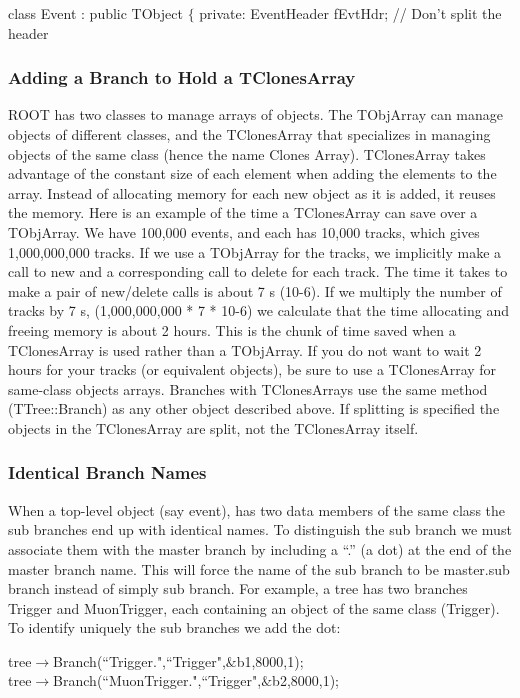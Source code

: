 \documentclass[12pt,a4paper]{article}
\begin{document}
class Event : public TObject $\{$
private:
EventHeader fEvtHdr;  // Don't split the header

\subsubsection{Adding a Branch to Hold a TClonesArray}
ROOT has two classes to manage arrays of objects. The TObjArray can manage objects of different classes, and the TClonesArray that specializes in managing objects of the same class (hence the name Clones Array). TClonesArray takes advantage of the constant size of each element when adding the elements to the array. Instead of allocating memory for each new object as it is added, it reuses the memory. Here is an example of the time a TClonesArray can save over a TObjArray. We have 100,000 events, and each has 10,000 tracks, which gives 1,000,000,000 tracks. If we use a TObjArray for the tracks, we implicitly make a call to new and a corresponding call to delete for each track. The time it takes to make a pair of new/delete calls is about 7 s (10-6). If we multiply the number of tracks by 7 s, (1,000,000,000 * 7 * 10-6) we calculate that the time allocating and freeing memory is about 2 hours. This is the chunk of time saved when a TClonesArray is used rather than a TObjArray. If you do not want to wait 2 hours for your tracks (or equivalent objects), be sure to use a TClonesArray for same-class objects arrays. Branches with TClonesArrays use the same method (TTree::Branch) as any other object described above. If splitting is specified the objects in the TClonesArray are split, not the TClonesArray itself.

\subsubsection{Identical Branch Names}
When a top-level object (say event), has two data members of the same class the sub branches end up with identical names. To distinguish the sub branch we must associate them with the master branch by including a “.” (a dot) at the end of the master branch name. This will force the name of the sub branch to be master.sub branch instead of simply sub branch. For example, a tree has two branches Trigger and MuonTrigger, each containing an object of the same class (Trigger). To identify uniquely the sub branches we add the dot:

tree$\rightarrow$Branch(``Trigger.",``Trigger",$\&$b1,8000,1); \\
tree$\rightarrow$Branch(``MuonTrigger.",``Trigger",$\&$b2,8000,1);
\end{document}
